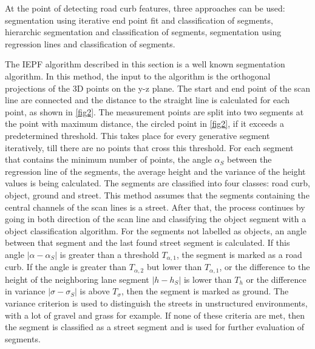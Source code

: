 \documentclass[conference]{IEEEtran}
\begin{document}
At the point of detecting road curb features, three approaches can be used: segmentation using iterative end point fit and classification of segments, hierarchic segmentation and classification of segments, segmentation using regression lines and classification of segments.

The IEPF algorithm described in this section is a well known segmentation algorithm. In this method, the input to the algorithm is the orthogonal projections of the 3D points on the y-z plane. The start and end point of the scan line are connected and the distance to the straight line is calculated for each point, as shown in \ref{fig2}. The measurement points are split into two segments at the point with maximum distance, the circled point in \ref{fig2}, if it exceeds a predetermined threshold. This takes place for every generative segment iteratively, till there are no points that cross this threshold. For each segment that contains the minimum number of points, the angle $\alpha_S$ between the regression line of the segments, the average height and the variance of the height values is being calculated. The segments are classified into four classes: road curb, object, ground and street. This method assumes that the segments containing the central channels of the scan lines is a street. After that, the process continues by going in both direction of the scan line and classifying the object segment with a object classification algorithm. For the segments not labelled as objects, an angle between that segment and the last found street segment is calculated. If this angle $|\alpha - \alpha_S|$ is greater than a threshold $T_{\alpha,1}$, the segment is marked as a road curb. If the angle is greater than $T_{\alpha,2}$ but lower than $T_{\alpha,1}$, or the difference to the height of the neighboring lane segment $|h - h_S|$ is lower than $T_h$ or the difference in variance $|\sigma - \sigma_S|$ is above $T_\sigma$, then the segment is marked as ground. The variance criterion is used to distinguish the streets in unstructured environments, with a lot of gravel and grass for example. If none of these criteria are met, then the segment is classified as a street segment and is used for further evaluation of segments. 
\end{document}
